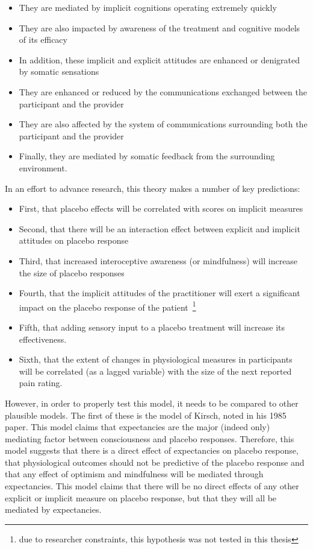 \begin{itemize}
\item They are mediated by implicit cognitions operating extremely quickly
\item They are also impacted by awareness of the treatment and cognitive models of its efficacy
\item In addition, these implicit and explicit attitudes are enhanced or denigrated by somatic sensations
\item They are enhanced or reduced by the communications exchanged between the participant and the provider
\item They are also affected by the system of communications surrounding both the participant and the provider
\item Finally, they are mediated by somatic feedback from the surrounding environment.
\end{itemize}
 
In an effort to advance research, this theory makes a number of key predictions:

\begin{itemize}
\item First, that placebo effects will be correlated with scores on implicit measures
\item Second, that there will be an interaction effect between explicit and implicit attitudes on placebo response
\item Third, that increased interoceptive awareness (or mindfulness) will increase the size of placebo responses
\item Fourth, that the implicit attitudes of the practitioner will exert a significant impact on the placebo response of the patient~\footnote{due to researcher constraints, this hypothesis was not tested in this thesis}
\item Fifth, that adding sensory input to a placebo treatment will increase its effectiveness. 
\item Sixth, that the extent of changes in physiological measures in participants will be correlated (as a lagged variable) with the size of the next reported pain rating.
\end{itemize}

However, in order to properly test this model, it needs to be compared to other plausible models. The first of these is the model of Kirsch, noted in his 1985 paper. This model claims that expectancies are the major (indeed only) mediating factor between consciousness and placebo responses. Therefore, this model suggests that there is a direct effect of expectancies on placebo response, that physiological outcomes should not be predictive of the placebo response and that any effect of optimism and mindfulness will be mediated through expectancies. This model claims that there will be no direct effects of any other explicit or implicit measure on placebo response, but that they will all be mediated by expectancies. 


